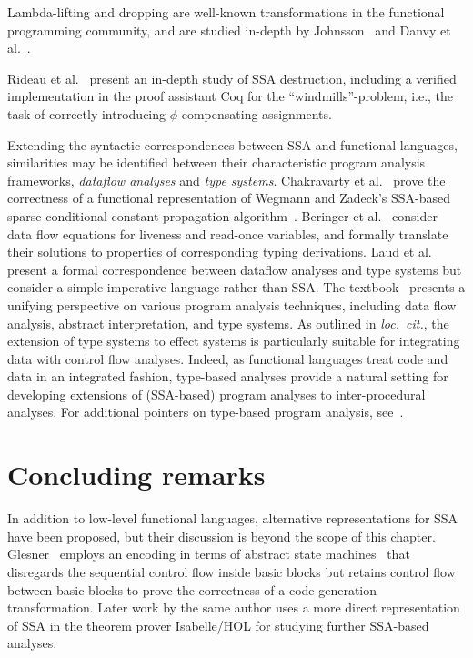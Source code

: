 Lambda-lifting and dropping are well-known transformations in the
functional programming community, and are studied in-depth by
Johnsson~\cite{DBLP:conf/fpca/Johnsson85} and Danvy et
al.~\cite{DBLP:journals/tcs/DanvyS00}.

Rideau et al.~\cite{DBLP:journals/jar/RideauSL08} present an in-depth
study of SSA destruction, including a verified implementation in the
proof assistant Coq for the ``windmills''-problem, i.e., the task of
correctly introducing $\phi$-compensating assignments.

Extending the syntactic correspondences between SSA and functional
languages, similarities may be identified between their characteristic
program analysis frameworks, \emph{dataflow analyses} and \emph{type
systems}.  Chakravarty et al.~\cite{ChakravartyKZ:COCV03} prove the
correctness of a functional representation of Wegmann and Zadeck's
SSA-based sparse conditional constant propagation
algorithm~\cite{WegmannZ:Toplas1991}.  Beringer et
al.~\cite{DBLP:journals/entcs/BeringerMS03} consider data flow
equations for liveness and read-once variables, and formally translate
their solutions to properties of corresponding typing derivations.
Laud et al.~\cite{DBLP:journals/tcs/LaudUV06} present a formal
correspondence between dataflow analyses and type systems but consider
a simple imperative language rather than SSA. The
textbook~\cite{DBLP:books/daglib/0015430} presents a unifying
perspective on various program analysis techniques, including data
flow analysis, abstract interpretation, and type systems. As outlined
in \emph{loc.~cit.}, the extension of type systems to effect systems
is particularly suitable for integrating data with control flow
analyses. Indeed, as functional languages treat code and data in an
integrated fashion, type-based analyses provide a natural setting for
developing extensions of (SSA-based) program analyses to
inter-procedural analyses. For additional pointers on type-based
program analysis, see~\cite{Palsberg:2001:TAA:379605.379635}.
%


\section{Concluding remarks}
\label{section:Part1:Semantics:Conclusion}
In addition to low-level functional languages, alternative
representations for SSA have been proposed, but their discussion is
beyond the scope of this chapter.
Glesner~\cite{DBLP:conf/asm/Glesner04} employs an encoding in terms of
abstract state machines~\cite{DBLP:journals/tocl/Gurevich00} that
disregards the sequential control flow inside basic blocks but retains
control flow between basic blocks to prove the correctness of a code
generation transformation. Later work by the same author uses a more
direct representation of SSA in the theorem prover Isabelle/HOL for
studying further SSA-based analyses.

